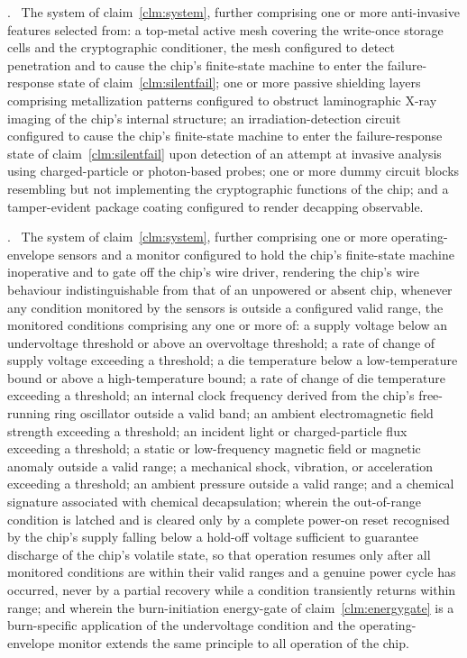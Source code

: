 \documentclass[12pt,letterpaper]{article}
\newcounter{claim}
\newcommand{\claim}[1]{\medskip\par\refstepcounter{claim}\noindent\arabic{claim}.~\label{clm:#1}\ignorespaces}
\newcommand{\clm}[1]{claim~\ref{clm:#1}}
\newcounter{fig}
\begin{document}
\claim{antiinvasive} The system of \clm{system}, further comprising one or more anti-invasive features selected from: a top-metal active mesh covering the write-once storage cells and the cryptographic conditioner, the mesh configured to detect penetration and to cause the chip's finite-state machine to enter the failure-response state of \clm{silentfail}; one or more passive shielding layers comprising metallization patterns configured to obstruct laminographic X-ray imaging of the chip's internal structure; an irradiation-detection circuit configured to cause the chip's finite-state machine to enter the failure-response state of \clm{silentfail} upon detection of an attempt at invasive analysis using charged-particle or photon-based probes; one or more dummy circuit blocks resembling but not implementing the cryptographic functions of the chip; and a tamper-evident package coating configured to render decapping observable.

\claim{envelope} The system of \clm{system}, further comprising one or more operating-envelope sensors and a monitor configured to hold the chip's finite-state machine inoperative and to gate off the chip's wire driver, rendering the chip's wire behaviour indistinguishable from that of an unpowered or absent chip, whenever any condition monitored by the sensors is outside a configured valid range, the monitored conditions comprising any one or more of: a supply voltage below an undervoltage threshold or above an overvoltage threshold; a rate of change of supply voltage exceeding a threshold; a die temperature below a low-temperature bound or above a high-temperature bound; a rate of change of die temperature exceeding a threshold; an internal clock frequency derived from the chip's free-running ring oscillator outside a valid band; an ambient electromagnetic field strength exceeding a threshold; an incident light or charged-particle flux exceeding a threshold; a static or low-frequency magnetic field or magnetic anomaly outside a valid range; a mechanical shock, vibration, or acceleration exceeding a threshold; an ambient pressure outside a valid range; and a chemical signature associated with chemical decapsulation; wherein the out-of-range condition is latched and is cleared only by a complete power-on reset recognised by the chip's supply falling below a hold-off voltage sufficient to guarantee discharge of the chip's volatile state, so that operation resumes only after all monitored conditions are within their valid ranges and a genuine power cycle has occurred, never by a partial recovery while a condition transiently returns within range; and wherein the burn-initiation energy-gate of \clm{energygate} is a burn-specific application of the undervoltage condition and the operating-envelope monitor extends the same principle to all operation of the chip.
\end{document}
